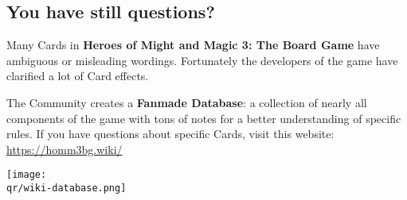 \begin{multicols*}{2}
\vspace*{1em}
\subsection*{You have still questions?}
Many Cards in \textbf{Heroes of Might and Magic 3: The Board Game} have ambiguous or misleading wordings.
Fortunately the developers of the game have clarified a lot of Card effects.\par
\begin{minipage}{5.7cm}
    The Community creates a \textbf{Fanmade Database}: a collection of nearly all components of the game with tons of notes for a better understanding of specific rules.
    If you have questions about specific Cards, visit this website:
    \mbox{\href{https://homm3bg.wiki/}{https://homm3bg.wiki/}}
\end{minipage}
\hfill
\begin{minipage}{2cm}
    \begin{center}
        \texttt{[image: \\qr/wiki-database.png]}
    \end{center}
\end{minipage}\par

\end{multicols*}
